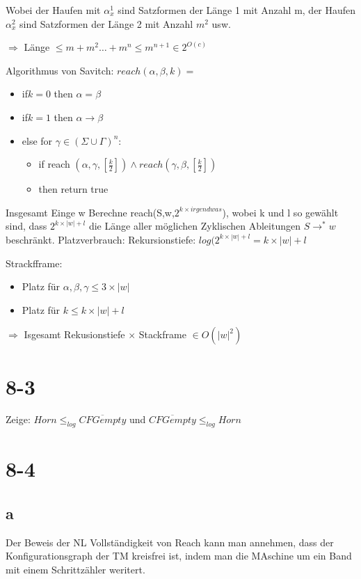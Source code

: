 \documentclass[12pt, oneside, a4paper, numbers=enddot, abstracton, parskip=full]{scrreprt}
\begin{document}
Wobei der Haufen mit $\alpha^1_x$ sind Satzformen der Länge 1 mit Anzahl m, der Haufen $\alpha^2_x$ sind Satzformen der Länge 2  mit Anzahl $m^2$ usw.

$\Rightarrow$ Länge $\leq m + m^2 \dots + m^n \leq m^{n+1} \in 2^{O(c)}$

Algorithmus von Savitch:
$reach(\alpha, \beta, k) = $
\begin{itemize}
\item if$k=0$ then $\alpha = \beta$
\item if$k=1$ then $\alpha \rightarrow \beta$
\item else for $\gamma \in (\Sigma \cup \Gamma)^n:$
  \begin{itemize}
  \item if reach $(\alpha, \gamma, [ \frac{k}{2} ] ) \wedge reach(\gamma, \beta, [ \frac{k}{2} ])$
  \item then return true
  \end{itemize}
\end{itemize}

  Insgesamt Einge w
  Berechne reach(S,w,$2^{k \times irgendwas}$), wobei k und l so gewählt sind, dass $2^{k \times |w| +l}$ die Länge aller möglichen Zyklischen Ableitungen $S\rightarrow^{*}w$ beschränkt.
  Platzverbrauch: Rekursionstiefe: $log(2^{k \times |w| +l} = k \times |w| +l$

  Strackfframe:
  \begin{itemize}
  \item Platz für $\alpha, \beta, \gamma \leq 3 \times |w|$
  \item Platz für $k \leq k \times |w| + l$

  \end{itemize}

  $\Rightarrow$ Isgesamt Rekusionstiefe $\times$ Stackframe $\in O(|w|^2)$

  \section{8-3}
  Zeige: $Horn \leq_{log} \overline{CFGempty}$ und $\overline{CFGempty}\leq_{log} Horn$

  \section{8-4}
  \subsection{a}
  Der Beweis der NL Vollständigkeit von Reach kann man annehmen, dass der Konfigurationsgraph der TM kreisfrei ist, indem man die MAschine um ein Band mit einem Schrittzähler weritert.
\end{document}
